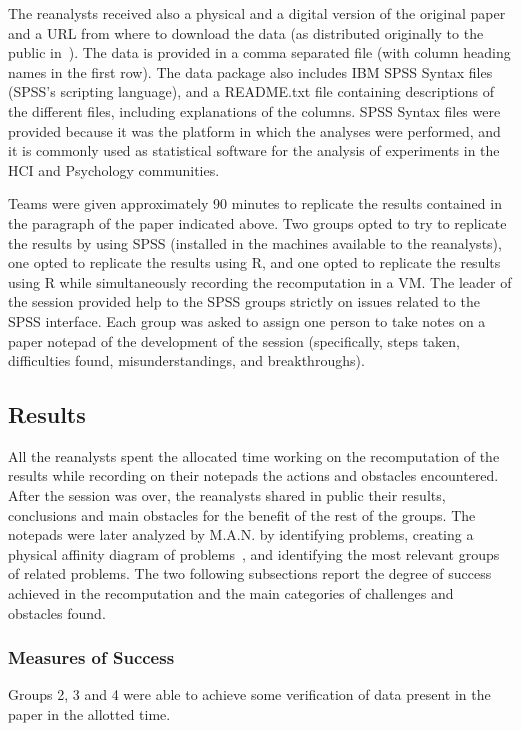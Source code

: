 The reanalysts received also a physical and a digital version of the original paper and a URL from where to download the data (as distributed originally to the public in~\cite{Nacenta:memorability_data}). The data is provided in a comma separated file (with column heading names in the first row). The data package also includes IBM SPSS Syntax files (SPSS's scripting language), and a README.txt file containing descriptions of the different files, including explanations of the columns. SPSS Syntax files were provided because it was the platform in which the analyses were performed, and it is commonly used as statistical software for the analysis of experiments in the HCI and Psychology communities. 

Teams were given approximately 90 minutes to replicate the results contained in the paragraph of the paper indicated above. Two groups opted to try to replicate the results by using SPSS (installed in the machines available to the reanalysts), one opted to replicate the results using R, and one opted to replicate the results using R while simultaneously recording the recomputation in a VM. The leader of the session provided help to the SPSS groups strictly on issues related to the SPSS interface. Each group was asked to assign one person to take notes on a paper notepad of the development of the session (specifically, steps taken, difficulties found, misunderstandings, and breakthroughs).

\subsection{Results}
All the reanalysts spent the allocated time working on the recomputation of the results while recording on their notepads the actions and obstacles encountered. After the session was over, the reanalysts shared in public their results, conclusions and main obstacles for the benefit of the rest of the groups. The notepads were later analyzed by M.A.N. by identifying problems, creating a physical affinity diagram of problems~\cite{hartson:2012}, and identifying the most relevant groups of related problems. The two following subsections report the degree of success achieved in the recomputation and the main categories of challenges and obstacles found.

\subsubsection{Measures of Success}
Groups 2, 3 and 4 were able to achieve some verification of data present in the paper in the allotted time.

